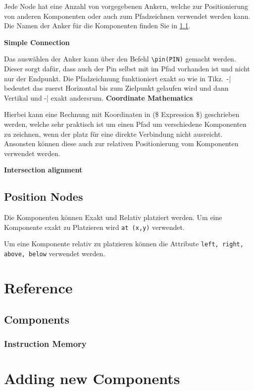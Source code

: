 \documentclass[
	ngerman,
	accentcolor=9c,%
	type=intern,
	marginpar=false
	]{article}
\begin{document}
Jede Node hat eine Anzahl von vorgegebenen Ankern, welche zur Positionierung von anderen Komponenten oder auch zum Pfadzeichnen verwendet werden kann. Die Namen der Anker für die Komponenten finden Sie in \ref{components}.

\textbf{Simple Connection}




Das auswählen der Anker kann über den Befehl \lstinline|\pin(PIN)| gemacht werden. Dieser sorgt dafür, dass auch der Pin selbst mit im Pfad vorhanden ist und nicht nur der Endpunkt. Die Pfadzeichnung funktioniert exakt so wie in Tikz. \lstinline|-|| bedeutet das zuerst Horizontal bis zum Zielpunkt gelaufen wird und dann Vertikal und \lstinline||-| exakt andersrum.
\newpage
\textbf{Coordinate Mathematics}




Hierbei kann eine Rechnung mit Koordinaten in (\$ Expression \$) geschrieben werden, welche sehr praktisch ist um einen Pfad um verschiedene Komponenten zu zeichnen, wenn der platz für eine direkte Verbindung nicht ausreicht. Ansonsten können diese auch zur relativen Positionierung vom Komponenten verwendet werden.

\newpage
\textbf{Intersection alignment}




\subsection{Position Nodes}




Die Komponenten können Exakt und Relativ platziert werden. Um eine Komponente exakt zu Platzieren wird \lstinline|at (x,y)| verwendet.

Um eine Komponente relativ zu platzieren können die Attribute \lstinline|left, right, above, below| verwendet werden.

\newpage
\section{Reference}
\subsection{Components}\label{components}

\subsubsection{Instruction Memory}





\section{Adding new Components}
\end{document}
